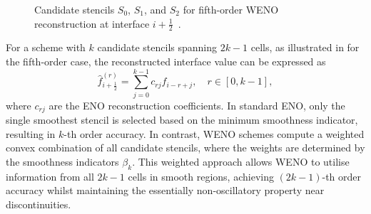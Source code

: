 \begin{figure}[t]
    \centering
    \caption{Candidate stencils $S_0$, $S_1$, and $S_2$ for fifth-order WENO reconstruction at interface $i+\frac{1}{2}$~\citep{CastroEtAl2011}.}
    \label{figure:weno_stencil}
\end{figure}

For a scheme with $k$ candidate stencils spanning $2k-1$ cells, as illustrated in  for the fifth-order case, the reconstructed interface value can be expressed as
\begin{equation}
\hat{f}_{i+\frac{1}{2}}^{(r)} = \sum_{j=0}^{k-1} c_{rj} f_{i-r+j}, \quad r \in [0, k-1],
\end{equation}
where $c_{rj}$ are the ENO reconstruction coefficients. In standard ENO, only the single smoothest stencil is selected based on the minimum smoothness indicator, resulting in $k$-th order accuracy. In contrast, WENO schemes compute a weighted convex combination of all candidate stencils, where the weights are determined by the smoothness indicators $\beta_k$. This weighted approach allows WENO to utilise information from all $2k-1$ cells in smooth regions, achieving $(2k-1)$-th order accuracy whilst maintaining the essentially non-oscillatory property near discontinuities.

